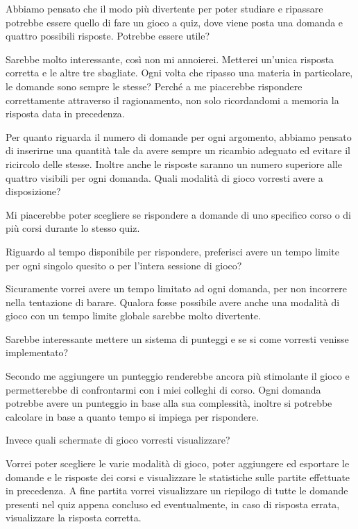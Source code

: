 {    
    \begin{QandA}
        \item Abbiamo pensato che il modo più divertente per poter studiare e ripassare potrebbe essere quello di fare un gioco a quiz, dove viene posta una domanda e quattro possibili risposte. Potrebbe essere utile?
            \begin{answered}
            Sarebbe molto interessante, così non mi annoierei. Metterei un'unica risposta corretta e le altre tre sbagliate. Ogni volta che ripasso una materia in particolare, le domande sono sempre le stesse? Perché a me piacerebbe rispondere correttamente attraverso il ragionamento, non solo ricordandomi a memoria la risposta data in precedenza.
            \end{answered}
        \item Per quanto riguarda il numero di domande per ogni argomento, abbiamo pensato di inserirne una quantità tale da avere sempre un ricambio adeguato ed evitare il ricircolo delle stesse. Inoltre anche le risposte saranno un numero superiore alle quattro visibili per ogni domanda.
        Quali modalità di gioco vorresti avere a disposizione?
            \begin{answered}
            Mi piacerebbe poter scegliere se rispondere a domande di uno specifico corso o di più corsi durante lo stesso quiz.
            \end{answered}
        \item Riguardo al tempo disponibile per rispondere, preferisci avere un tempo limite per ogni singolo quesito o per l'intera sessione di gioco?
            \begin{answered}
            Sicuramente vorrei avere un tempo limitato ad ogni domanda, per non incorrere nella tentazione di barare. Qualora fosse possibile avere anche una modalità di gioco con un tempo limite globale sarebbe molto divertente. 
            \end{answered}
        \item Sarebbe interessante mettere un sistema di punteggi e se si come vorresti venisse implementato?
            \begin{answered}
            Secondo me aggiungere un punteggio renderebbe ancora più stimolante il gioco e permetterebbe di confrontarmi con i miei colleghi di corso. Ogni domanda potrebbe avere un punteggio in base alla sua complessità, inoltre si potrebbe calcolare in base a quanto tempo si impiega per rispondere.
            \end{answered}
        \item Invece quali schermate di gioco vorresti visualizzare?
            \begin{answered}
            Vorrei poter scegliere le varie modalità di gioco, poter aggiungere ed esportare le domande e le risposte dei corsi e visualizzare le statistiche sulle partite effettuate in precedenza. A fine partita vorrei visualizzare un riepilogo di tutte le domande presenti nel quiz appena concluso ed eventualmente, in caso di risposta errata, visualizzare la risposta corretta.
            \end{answered}
    \end{QandA}
}
    \newpage
    
